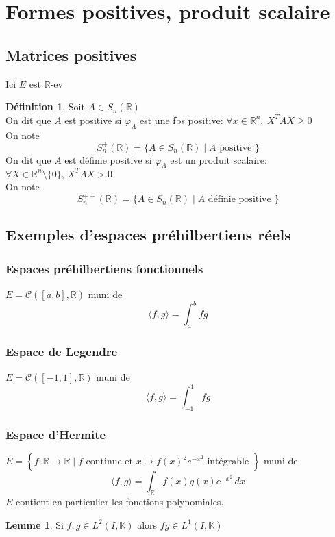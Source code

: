 \documentclass[10pt,a4paper]{article}
\theoremstyle{definition}
\newtheorem{lemma}[proposition]{Lemme}
\newtheorem{definition}[proposition]{Définition}
\begin{document}
\section{Formes positives, produit scalaire}
\subsection{Matrices positives}
\noindent Ici \(E\) est \(\mathbb{R}\)-ev
\begin{definition}
    Soit \(A \in S_n(\mathbb{R})\) \\
    On dit que \(A\) est positive si \(\varphi_A\) est une fbs positive: \(\forall x \in \mathbb{R}^n,\ X^T A X \geq 0\) \\
    On note \[S_n^+(\mathbb{R}) = \{A \in S_n(\mathbb{R}) \mid A \text{ positive }\}\]
    On dit que \(A\) est définie positive si \(\varphi_A\) est un produit scalaire: \(\forall X \in \mathbb{R}^n \setminus \{0\},\, X^T A X > 0\) \\
    On note \[S_n^{++}(\mathbb{R}) = \{A \in S_n(\mathbb{R}) \mid A \text{ définie positive }\}\]
\end{definition}

\subsection{Exemples d'espaces préhilbertiens réels}
\subsubsection{Espaces préhilbertiens fonctionnels}
\noindent \(E = \mathcal{C}([a, b], \mathbb{R})\) muni de
\[ \langle f, g \rangle = \int_{a}^{b} fg\]

\subsubsection{Espace de Legendre}
\noindent \(E = \mathcal{C}([-1, 1], \mathbb{R})\) muni de 
\[\langle f, g \rangle = \int_{-1}^{1} fg\]

\subsubsection{Espace d'Hermite}
\noindent \(E = \left\{ f: \mathbb{R} \to \mathbb{R} \mid f \text{ continue et } x \mapsto f(x)^2 e^{-x^2} \text{ intégrable }\right\}\) muni de 
\[\langle f, g \rangle = \int_{\mathbb{R}} f(x) g(x) e^{-x^2} \,dx\]
\(E\) contient en particulier les fonctions polynomiales.
\begin{lemma}
    Si \(f, g \in L^2(I, \mathbb{K})\) alors \(fg \in L^1(I, \mathbb{K})\)
\end{lemma}
\end{document}
